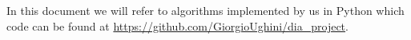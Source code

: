 In this document we will refer to algorithms implemented by us in Python which code can be found at \url{https://github.com/GiorgioUghini/dia_project}.